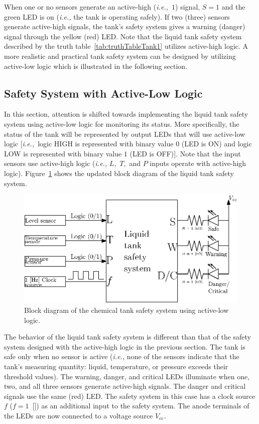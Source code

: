 %
When one or no sensors generate an active-high (\textit{i.e.,~}$1$) signal, $S=1$ and the green LED is on (\textit{i.e.,} the tank is operating safely). If two (three) sensors generate active-high signals, the tank's safety system gives a warning (danger) signal through the yellow (red) LED.  Note that the liquid tank safety system described by the truth table~\ref{tab:truthTableTank1} utilizes active-high logic. A more realistic and practical tank safety system can be designed by utilizing active-low logic which is illustrated in the following section. 


\subsection{Safety System with Active-Low Logic}
\label{sec:safetySystemAL}
In this section, attention is shifted towards implementing the liquid tank safety system using active-low logic for monitoring its status. More specifically, the status of the tank will be represented by output LEDs that will use active-low logic [\textit{i.e.,}~logic HIGH is represented with binary value $0$ (LED is ON) and logic LOW is represented with binary value $1$ (LED is OFF)].  Note that the input sensors use active-high logic (\textit{i.e.,} $L,$ $T,$ and $P$ inputs operate with active-high logic). Figure~\ref{fig:safetySys} shows the updated block diagram of the liquid tank safety system. %
%
\begin{figure}[h]
    \centering
    \includegraphics{figs/ipe/lab_10/safetySys.eps}
    \caption{Block diagram of the chemical tank safety system using active-low logic.}
    \label{fig:safetySys}
\end{figure}
%
The behavior of the liquid tank safety system is different than that of the safety system designed with the active-high logic in the previous section. The tank is safe only when no sensor is active (\textit{i.e.,} none of the sensors indicate that the tank's measuring quantity: liquid, temperature, or pressure exceeds their threshold values). The warning, danger, and critical LEDs  illuminate  when one, two, and all three sensors generate active-high signals. The danger and critical signals use the same (red) LED. The safety system in this case has a clock source $f$ ($f=1$~[\hertz]) as an additional input to the safety system. The anode terminals of the LEDs are now connected to a voltage source $V_{\text{cc}}.$  
